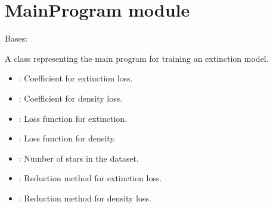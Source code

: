 \documentclass[letterpaper,10pt,english]{sphinxmanual}
\begin{document}
\sphinxstepscope


\section{MainProgram module}
\label{\detokenize{MainProgram:module-MainProgram}}\label{\detokenize{MainProgram:mainprogram-module}}\label{\detokenize{MainProgram::doc}}

\begin{fulllineitems}
\label{\detokenize{MainProgram:MainProgram.MainProgram}}
\pysigstartsignatures
{}
\pysigstopsignatures
\sphinxAtStartPar
Bases: 

\sphinxAtStartPar
A class representing the main program for training an extinction model.
\begin{description}
\begin{itemize}
\item {} 
\sphinxAtStartPar
{}: Coefficient for extinction loss.

\item {} 
\sphinxAtStartPar
{}: Coefficient for density loss.

\item {} 
\sphinxAtStartPar
{}: Loss function for extinction.

\item {} 
\sphinxAtStartPar
{}: Loss function for density.

\item {} 
\sphinxAtStartPar
{}: Number of stars in the dataset.

\item {} 
\sphinxAtStartPar
{}: Reduction method for extinction loss.

\item {} 
\sphinxAtStartPar
{}: Reduction method for density loss.


\end{itemize}
\end{description}
\end{fulllineitems}
\end{document}
